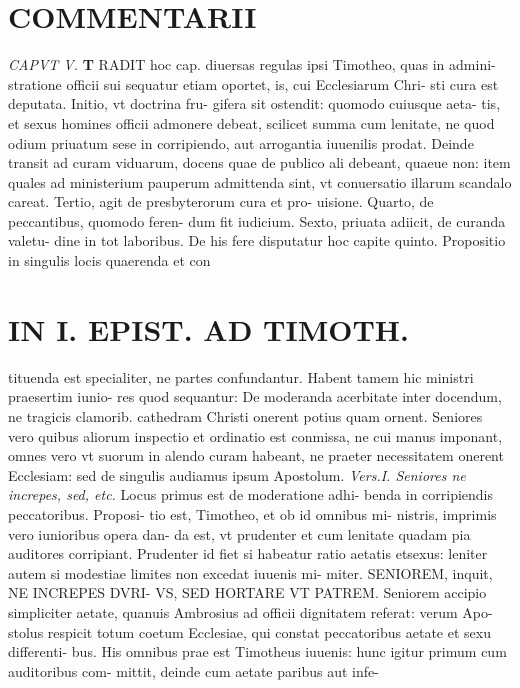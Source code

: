 \documentclass{article}
\begin{document}
\begin{pages}
\section*{COMMENTARII }
\marginpar{[ p.116 ]}
\textit{CAPVT V. }
\textbf{T }\pstart RADIT hoc cap. diuersas regulas ipsi Timotheo, quas in admini- stratione officii sui sequatur etiam oportet, is, cui Ecclesiarum Chri- sti cura est deputata. Initio, vt doctrina fru- gifera sit ostendit: quomodo cuiusque aeta- tis, et sexus homines officii admonere debeat, scilicet summa cum lenitate, ne quod odium priuatum sese in corripiendo, aut arrogantia iuuenilis prodat.  \pend\pstart Deinde transit ad curam viduarum, docens quae de publico ali debeant, quaeue non: item quales ad ministerium pauperum admittenda sint, vt conuersatio illarum scandalo careat.  \pend\pstart Tertio, agit de presbyterorum cura et pro- uisione.  \pend\pstart Quarto, de peccantibus, quomodo feren- dum fit iudicium.  \pend\pstart Sexto, priuata adiicit, de curanda valetu- dine in tot laboribus. De his fere disputatur hoc capite quinto.  \pend\pstart Propositio in singulis locis quaerenda et con  \pend
\section*{IN I. EPIST. AD TIMOTH. }
\marginpar{[ p.117 ]}\pstart tituenda est specialiter, ne partes confundantur. Habent tamem hic ministri praesertim iunio- res quod sequantur: De moderanda acerbitate inter docendum, ne tragicis clamorib. cathedram Christi onerent potius quam ornent. Seniores vero quibus aliorum inspectio et ordinatio est conmissa, ne cui manus imponant, omnes vero vt suorum in alendo curam habeant, ne praeter necessitatem onerent Ecclesiam: sed de singulis audiamus ipsum Apostolum.  \pend
\textit{Vers.I. Seniores ne increpes, sed, etc. }\pstart Locus primus est de moderatione adhi- benda in corripiendis peccatoribus. Proposi- tio est, Timotheo, et ob id omnibus mi- nistris, imprimis vero iunioribus opera dan- da est, vt prudenter et cum lenitate quadam pia auditores corripiant. Prudenter id fiet si habeatur ratio aetatis etsexus: leniter autem si modestiae limites non excedat iuuenis mi- miter.  \pend\pstart SENIOREM, inquit, NE INCREPES DVRI- VS, SED HORTARE VT PATREM. Seniorem accipio simpliciter aetate, quanuis Ambrosius ad officii dignitatem referat: verum Apo- stolus respicit totum coetum Ecclesiae, qui constat peccatoribus aetate et sexu differenti- bus. His omnibus prae est Timotheus iuuenis: hunc igitur primum cum auditoribus com- mittit, deinde cum aetate paribus aut infe-  \pend

\end{pages}
\end{document}

